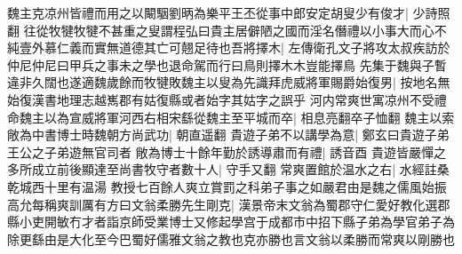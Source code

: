 魏主克凉州皆禮而用之以闞駰劉昞為樂平王丕從事中郎安定胡叟少有俊才|{
	少詩照翻}
往從牧犍牧犍不甚重之叟謂程弘曰貴主居僻陋之國而淫名僭禮以小事大而心不純壹外慕仁義而實無道德其亡可翹足待也吾將擇木|{
	左傳衛孔文子將攻太叔疾訪於仲尼仲尼曰甲兵之事未之學也退命駕而行曰鳥則擇木木豈能擇鳥}
先集于魏與子暫違非久闊也遂適魏歲餘而牧犍敗魏主以叟為先識拜虎威將軍賜爵始復男|{
	按地名無始復漢書地理志越嶲郡有姑復縣或者始字其姑字之誤乎}
河内常爽世寓凉州不受禮命魏主以為宣威將軍河西右相宋繇從魏主至平城而卒|{
	相息亮翻卒子恤翻}
魏主以索敞為中書博士時魏朝方尚武功|{
	朝直遥翻}
貴遊子弟不以講學為意|{
	鄭玄曰貴遊子弟王公之子弟遊無官司者}
敞為博士十餘年勤於誘導肅而有禮|{
	誘音酉}
貴遊皆嚴憚之多所成立前後顯達至尚書牧守者數十人|{
	守手又翻}
常爽置館於温水之右|{
	水經註桑乾城西十里有温湯}
教授七百餘人爽立賞罰之科弟子事之如嚴君由是魏之儒風始振高允每稱爽訓厲有方曰文翁柔勝先生剛克|{
	漢景帝末文翁為蜀郡守仁愛好教化選郡縣小吏開敏冇才者詣京師受業博士又修起學宫于成都市中招下縣子弟為學官弟子為除更繇由是大化至今巴蜀好儒雅文翁之教也克亦勝也言文翁以柔勝而常爽以剛勝也}

